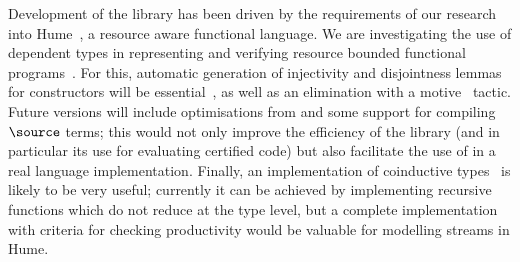 Development of the library has been driven by the requirements of
our research into Hume~\cite{Hume-GPCE}, a resource aware functional
language. We are investigating the use of dependent types in
representing and verifying resource bounded functional
programs~\cite{dt-framework}. For this, automatic generation of
injectivity and disjointness lemmas for constructors will be
essential~\cite{concon}, as well as an elimination with a
motive~\cite{elim-motive} tactic. Future versions will include
optimisations from \cite{brady-thesis} and some support for compiling
$\source$ terms; this would not only improve the efficiency of the
library (and in particular its use for evaluating certified code)
but also facilitate the use of \Ivor{} in a real language
implementation. Finally, an implementation of coinductive
types~\cite{coinductive} is likely to be very useful; currently it can
be achieved by implementing recursive functions which do not reduce at
the type level, but a complete implementation with criteria for
checking productivity would be valuable for modelling streams in Hume.
